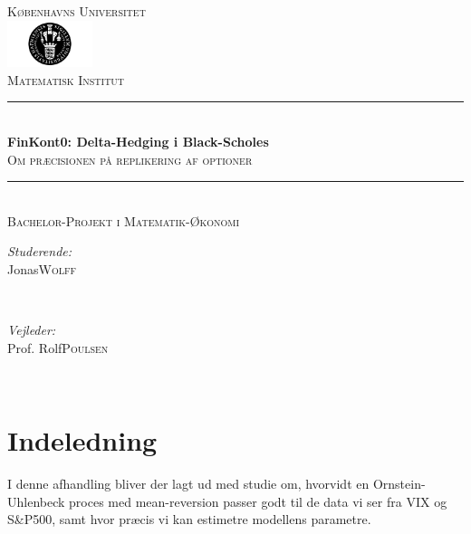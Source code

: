\documentclass{article}
\title{\thesistitle}
\author{\thesisauthorfirst\space\thesisauthorsecond}
\date{\thesisdate}
\def\thesistitle{FinKont0: Delta-Hedging i Black-Scholes}
\def\thesissubtitle{Om præcisionen på replikering af optioner}
\def\thesisauthorfirst{Jonas}
\def\thesisauthorsecond{Wolff}
\def\thesissupervisorfirst{Prof. Rolf}
\def\thesissupervisorsecond{Poulsen}
\def\thesissecondreaderfirst{Prof. Anders}
\def\thesissecondreadersecond{And}
\def\thesisdate{Juni 2022}
\theoremstyle{definition}
\theoremstyle{remark}
\begin{document}
\begin{titlepage}
	\thispagestyle{empty}
	\newcommand{\HRule}{\rule{\linewidth}{0.5mm}}
	\center
	\textsc{\Large Københavns Universitet}\\[.7cm]
	\includegraphics[width=25mm]{img/ku_segl.png}\\[.5cm]
	\textsc{Matematisk Institut}\\[0.5cm]
	
	\HRule \\[0.4cm]
	{ \huge \bfseries \thesistitle}\\[0.1cm]
	\textsc{\thesissubtitle}\\
	\HRule \\[.5cm]
	\textsc{\large Bachelor-Projekt i Matematik-Økonomi}\\[.5cm]
	
	\begin{minipage}{0.4\textwidth}
	\begin{flushleft} \large
	\emph{Studerende:}\\
	\thesisauthorfirst\space \textsc{\thesisauthorsecond}
	\end{flushleft}
	\end{minipage}
	~
	\begin{minipage}{0.4\textwidth}
	\begin{flushright} \large
	\emph{Vejleder:} \\
	\thesissupervisorfirst\space \textsc{\thesissupervisorsecond} \\[1em]
	\end{flushright}
	\end{minipage}\\[4cm]
	\clearpage
\end{titlepage}

\tableofcontents

\newpage
\setcounter{section}{-1}
\section{Indeledning}
I denne afhandling bliver der lagt ud med studie om, hvorvidt en Ornstein-Uhlenbeck proces med mean-reversion passer godt til de data vi ser fra VIX og S\&P500, samt hvor præcis vi kan estimetre modellens parametre.
\end{document}
